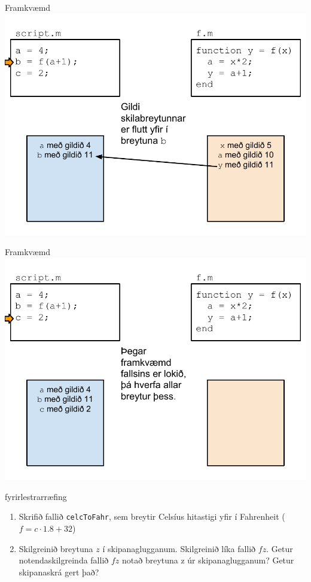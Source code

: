\documentclass{beamer}
\begin{document}
\begin{frame}{Framkvæmd}
\includegraphics[width=\textwidth]{Pics/framkvaemd-falls-6}
\end{frame}
\begin{frame}{Framkvæmd}
\includegraphics[width=\textwidth]{Pics/framkvaemd-falls-7}
\end{frame}

\begin{frame}{fyrirlestrarræfing}
\begin{enumerate}
 \item Skrifið fallið \texttt{celcToFahr}, sem breytir Celsíus hitastigi yfir í Fahrenheit ($f = c\cdot1.8 + 32$)
 \item Skilgreinið breytuna $z$ í skipanaglugganum. Skilgreinið líka fallið $fz$. Getur notendaskilgreinda fallið $fz$ notað breytuna z úr skipanaglugganum? Getur skipanaskrá gert það?
\end{enumerate}
\end{frame}
\end{document}
